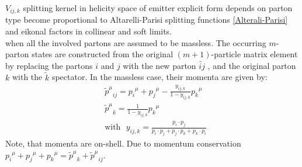 $ V_{ij,k} $ splitting kernel in helicity space of emitter
explicit form depends on parton type become proportional to Altarelli-Parisi splitting functions \ref{Alterali-Parisi} and eikonal factors
in collinear and soft limits.\\
when all the involved partons are assumed to be massless. The occurring $ m $-parton states are constructed from the original $(m+ 1)$-particle matrix element by replacing the partons $ i $ and $ j $ with the new parton $  \widetilde{ij} $ , and the original parton $ k $ with the $  \widetilde{k} $ spectator. In the massless case, their momenta are given by:
\begin{equation}
\begin{split}
&{\tilde{p}^{\mu}}_{ij} = {p_i}^{\mu}+{p_j}^{\mu}-\frac{y_{ij,k}}{1-y_{ij,k}}{p_k}^{\mu}\\
&{\tilde{p}^{\mu}}_{k} = \frac{1}{1-y_{ij,k}}{p_k}^{\mu}\\
&\text{with}\:\:\:y_{ij,k}=\frac{p_i \cdot p_j}{p_i \cdot p_j+p_j \cdot p_k+p_k \cdot p_i}
\end{split}
\end{equation}
Note, that momenta are on-shell. Due to momentum conservation ${p_i}^{\mu}+{p_j}^{\mu}+{p_k}^{\mu}= {\tilde{p}^{\mu}}_{k} +{\tilde{p}^{\mu}}_{ij} $. 





\newpage
